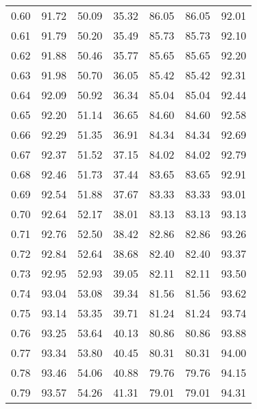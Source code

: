 \begin{tabular}{|c|c|c|c|c|c|c|}
      0.60 &     91.72 &     50.09 &      35.32 &   86.05 &      86.05 &         92.01 \\
      0.61 &     91.79 &     50.20 &      35.49 &   85.73 &      85.73 &         92.10 \\
      0.62 &     91.88 &     50.46 &      35.77 &   85.65 &      85.65 &         92.20 \\
      0.63 &     91.98 &     50.70 &      36.05 &   85.42 &      85.42 &         92.31 \\
      0.64 &     92.09 &     50.92 &      36.34 &   85.04 &      85.04 &         92.44 \\
      0.65 &     92.20 &     51.14 &      36.65 &   84.60 &      84.60 &         92.58 \\
      0.66 &     92.29 &     51.35 &      36.91 &   84.34 &      84.34 &         92.69 \\
      0.67 &     92.37 &     51.52 &      37.15 &   84.02 &      84.02 &         92.79 \\
      0.68 &     92.46 &     51.73 &      37.44 &   83.65 &      83.65 &         92.91 \\
      0.69 &     92.54 &     51.88 &      37.67 &   83.33 &      83.33 &         93.01 \\
      0.70 &     92.64 &     52.17 &      38.01 &   83.13 &      83.13 &         93.13 \\
      0.71 &     92.76 &     52.50 &      38.42 &   82.86 &      82.86 &         93.26 \\
      0.72 &     92.84 &     52.64 &      38.68 &   82.40 &      82.40 &         93.37 \\
      0.73 &     92.95 &     52.93 &      39.05 &   82.11 &      82.11 &         93.50 \\
      0.74 &     93.04 &     53.08 &      39.34 &   81.56 &      81.56 &         93.62 \\
      0.75 &     93.14 &     53.35 &      39.71 &   81.24 &      81.24 &         93.74 \\
      0.76 &     93.25 &     53.64 &      40.13 &   80.86 &      80.86 &         93.88 \\
      0.77 &     93.34 &     53.80 &      40.45 &   80.31 &      80.31 &         94.00 \\
      0.78 &     93.46 &     54.06 &      40.88 &   79.76 &      79.76 &         94.15 \\
      0.79 &     93.57 &     54.26 &      41.31 &   79.01 &      79.01 &         94.31 \\

\end{tabular}
